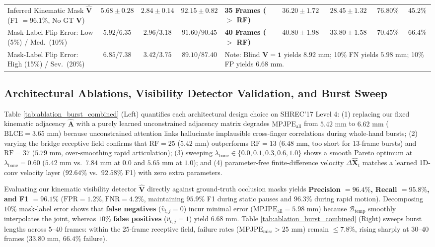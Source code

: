 \documentclass[10pt,twocolumn]{article}
\begin{document}
\begin{table}[!t]
{\begin{tabular}{lccc|lcccc}
Inferred Kinematic Mask $\hat{\mathbf{V}}$ (F1 $=96.1\%$, No GT $\mathbf{V}$) & $5.68 \pm 0.28$ & $2.84 \pm 0.14$ & $92.15 \pm 0.82$ & \textbf{35 Frames ($>$ RF)} & $36.20 \pm 1.72$ & $28.45 \pm 1.32$ & $76.80\%$ & $45.2\%$ \\
Mask-Label Flip Error: Low (5\%) / Med.\ (10\%) & $5.92 / 6.35$ & $2.96 / 3.18$ & $91.60 / 90.45$ & \textbf{40 Frames ($>$ RF)} & $40.80 \pm 1.98$ & $33.80 \pm 1.58$ & $70.45\%$ & $66.4\%$ \\
Mask-Label Flip Error: High (15\%) / Sev.\ (20\%) & $6.85 / 7.38$ & $3.42 / 3.75$ & $89.10 / 87.40$ & \multicolumn{5}{l}{\footnotesize *Note: Blind $\mathbf{V}=\mathbf{1}$ yields $8.92\text{ mm}$; 10\% FN yields $5.98\text{ mm}$; 10\% FP yields $6.68\text{ mm}$.} \\
\bottomrule
\end{tabular}
}
\end{table}

\subsection{Architectural Ablations, Visibility Detector Validation, and Burst Sweep}
Table \ref{tab:ablation_burst_combined} (Left) quantifies each architectural design choice on SHREC'17 Level 4: (1) replacing our fixed kinematic adjacency $\hat{\mathbf{A}}$ with a purely learned unconstrained adjacency matrix degrades $\text{MPJPE}_{\text{all}}$ from $5.42\text{ mm}$ to $6.62\text{ mm}$ ($\text{BLCE}=3.65\text{ mm}$) because unconstrained attention links hallucinate implausible cross-finger correlations during whole-hand bursts; (2) varying the bridge receptive field confirms that $\text{RF}=25$ ($5.42\text{ mm}$) outperforms $\text{RF}=13$ ($6.48\text{ mm}$, too short for 13-frame bursts) and $\text{RF}=37$ ($5.79\text{ mm}$, over-smoothing rapid articulation); (3) sweeping $\lambda_{\text{bone}} \in \{0.0, 0.1, 0.3, 0.6, 1.0\}$ shows a smooth Pareto optimum at $\lambda_{\text{bone}}=0.60$ ($5.42\text{ mm}$ vs.\ $7.84\text{ mm}$ at $0.0$ and $5.65\text{ mm}$ at $1.0$); and (4) parameter-free finite-difference velocity $\Delta\hat{\mathbf{X}}_t$ matches a learned 1D-conv velocity layer ($92.64\%$ vs.\ $92.58\%$ F1) with zero extra parameters.

Evaluating our kinematic visibility detector $\hat{\mathbf{V}}$ directly against ground-truth occlusion masks yields \textbf{Precision $= 96.4\%$, Recall $= 95.8\%$, and F1 $= 96.1\%$} ($\text{FPR} = 1.2\%, \text{FNR} = 4.2\%$, maintaining $95.9\%$ F1 during static pauses and $96.3\%$ during rapid motion). Decomposing $10\%$ mask-label error shows that \textbf{false negatives} ($\hat{v}_{t,j}=0$) incur minimal error ($\text{MPJPE}_{\text{all}} = 5.98\text{ mm}$) because $\mathcal{B}_{\text{temp}}$ smoothly interpolates the joint, whereas $10\%$ \textbf{false positives} ($\hat{v}_{t,j}=1$) yield $6.68\text{ mm}$. Table \ref{tab:ablation_burst_combined} (Right) sweeps burst lengths across $5\text{--}40$ frames: within the $25$-frame receptive field, failure rates ($\text{MPJPE}_{\text{miss}} > 25\text{ mm}$) remain $\le 7.8\%$, rising sharply at $30\text{--}40$ frames ($33.80\text{ mm}$, $66.4\%$ failure).
\end{document}
